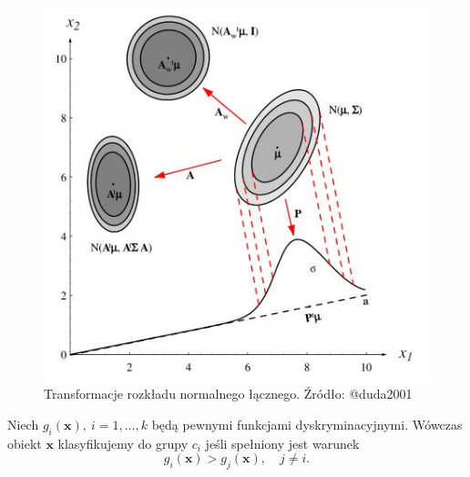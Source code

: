 \documentclass[
]{book}
\theoremstyle{plain}
\theoremstyle{definition}
\theoremstyle{definition}
\theoremstyle{definition}
\theoremstyle{definition}
\theoremstyle{remark}
\let\BeginKnitrBlock\begin \let\EndKnitrBlock\end
\begin{document}
\begin{figure}

{\centering \includegraphics[width=4.52in]{images/transform} 

}

\caption{Transformacje rozkładu normalnego łącznego. Źródło: @duda2001}\label{fig:trans}
\end{figure}

\BeginKnitrBlock{definition}
\protect\hypertarget{def:unnamed-chunk-60}{}{\label{def:unnamed-chunk-60} }Niech \(g_i(\boldsymbol{x}),\ i=1,\ldots,k\) będą pewnymi funkcjami dyskryminacyjnymi. Wówczas obiekt \(\boldsymbol{x}\) klasyfikujemy do grupy \(c_i\) jeśli spełniony jest warunek
\begin{equation}
    g_i(\boldsymbol{x})>g_j(\boldsymbol{x}), \quad j\neq i.
\end{equation}
\EndKnitrBlock{definition}
\end{document}
